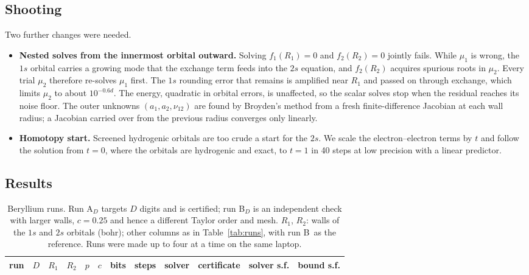 \documentclass[aps,pra,reprint,superscriptaddress,amsmath,amssymb,longbibliography]{revtex4-2}
\begin{document}
\subsection{Shooting}

Two further changes were needed.
\begin{itemize}
\item \textbf{Nested solves from the innermost orbital outward.} Solving $f_1(R_1)=0$ and $f_2(R_2)=0$ jointly fails. While $\mu_1$ is wrong, the $1s$ orbital carries a growing mode that the exchange term feeds into the $2s$ equation, and $f_2(R_2)$ acquires spurious roots in $\mu_2$. Every trial $\mu_2$ therefore re-solves $\mu_1$ first. The $1s$ rounding error that remains is amplified near $R_1$ and passed on through exchange, which limits $\mu_2$ to about $10^{-0.6d}$. The energy, quadratic in orbital errors, is unaffected, so the scalar solves stop when the residual reaches its noise floor. The outer unknowns $(a_1,a_2,\nu_{12})$ are found by Broyden's method from a fresh finite-difference Jacobian at each wall radius; a Jacobian carried over from the previous radius converges only linearly.
\item \textbf{Homotopy start.} Screened hydrogenic orbitals are too crude a start for the $2s$. We scale the electron--electron terms by $t$ and follow the solution from $t=0$, where the orbitals are hydrogenic and exact, to $t=1$ in 40 steps at low precision with a linear predictor.
\end{itemize}

\subsection{Results}

\begin{table}[t]
\caption{Beryllium runs. Run A$_D$ targets $D$ digits and is certified; run B$_D$ is an independent check with larger walls, $c=0.25$ and hence a different Taylor order and mesh. $R_1$, $R_2$: walls of the $1s$ and $2s$ orbitals (bohr); other columns as in Table~\ref{tab:runs}, with run B\BeRef\ as the reference. Runs were made up to four at a time on the same laptop.}
\label{tab:beruns}
\begin{ruledtabular}
\begin{tabular}{lrrrrrrrrrrr}
run & $D$ & $R_1$ & $R_2$ & $p$ & $c$ & bits & steps & solver & certificate & solver s.f. & bound s.f. \\
\hline

\end{tabular}
\end{ruledtabular}
\end{table}
\end{document}
